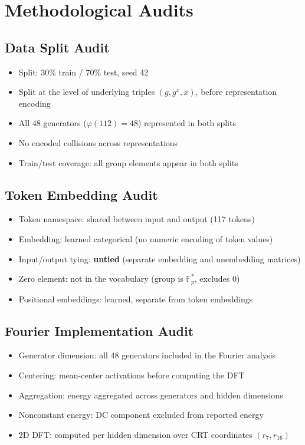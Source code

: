 \documentclass[11pt,a4paper]{article}
\begin{document}
\section{Methodological Audits}

\subsection{Data Split Audit}

\begin{itemize}
\item Split: 30\% train / 70\% test, seed 42
\item Split at the level of underlying triples $(g, g^x, x)$, before representation encoding
\item All 48 generators ($\varphi(112) = 48$) represented in both splits
\item No encoded collisions across representations
\item Train/test coverage: all group elements appear in both splits
\end{itemize}

\subsection{Token Embedding Audit}

\begin{itemize}
\item Token namespace: shared between input and output (117 tokens)
\item Embedding: learned categorical (no numeric encoding of token values)
\item Input/output tying: \textbf{untied} (separate embedding and unembedding matrices)
\item Zero element: not in the vocabulary (group is $\mathbb{F}_p^*$, excludes 0)
\item Positional embeddings: learned, separate from token embeddings
\end{itemize}

\subsection{Fourier Implementation Audit}

\begin{itemize}
\item Generator dimension: all 48 generators included in the Fourier analysis
\item Centering: mean-center activations before computing the DFT
\item Aggregation: energy aggregated across generators and hidden dimensions
\item Nonconstant energy: DC component excluded from reported energy
\item 2D DFT: computed per hidden dimension over CRT coordinates $(r_7, r_{16})$
\end{itemize}
\end{document}
